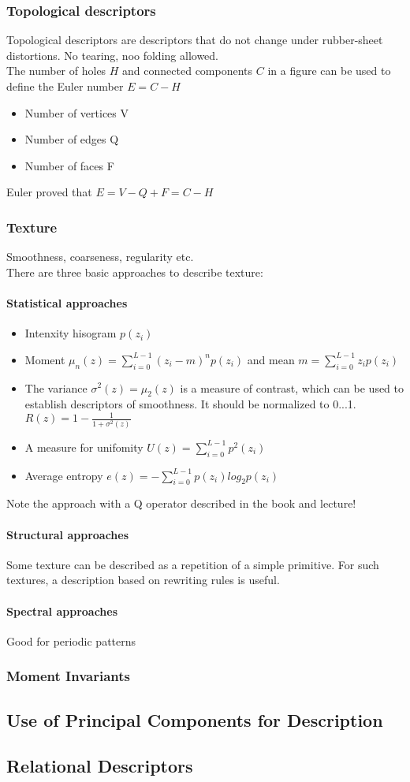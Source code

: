 \subsubsection{Topological descriptors}
Topological descriptors are descriptors that do not change under rubber-sheet distortions. No tearing, noo folding allowed.\\
The number of holes $H$ and connected components $C$ in a figure can be used to define the Euler number $E=C-H$\\
\begin{itemize}
\item Number of vertices V
\item Number of edges Q
\item Number of faces F
\end{itemize}
Euler proved that $E=V-Q+F=C-H$
\subsubsection{Texture}
Smoothness, coarseness, regularity etc.\\
There are three basic approaches to describe texture:\\
\paragraph{Statistical approaches}
\begin{itemize}
\item Intenxity hisogram $p(z_i)$
\item Moment $\mu_n(z)=\sum\limits_{i=0}^{L-1}(z_i-m)^np(z_i)$ and mean $m=\sum\limits_{i=0}^{L-1}z_ip(z_i)$
\item The variance $\sigma ^2(z) =\mu_2 (z)$ is a measure of contrast, which can be used to establish descriptors of smoothness. It should be normalized to 0...1. $R(z)=1-\frac{1}{1+\sigma ^2(z)}$
\item A measure for unifomity $U(z)=\sum\limits_{i=0}^{L-1}p^2(z_i)$
\item Average entropy $e(z)=-\sum\limits_{i=0}^{L-1}p(z_i)log_2p(z_i)$
\end{itemize}
Note the approach with a Q operator described in the book and lecture!\\
\paragraph{Structural approaches}
Some texture can be described as a repetition of a simple primitive. For such textures, a description based on rewriting rules is useful.
\paragraph{Spectral approaches}
Good for periodic patterns
\subsubsection{Moment Invariants}
\subsection{Use of Principal Components for Description}
\subsection{Relational Descriptors}
